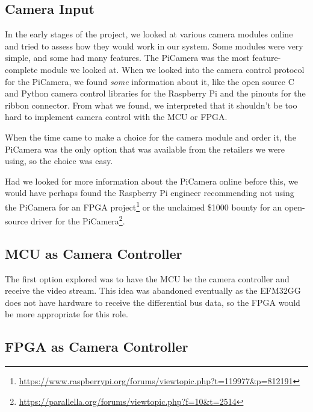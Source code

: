 \subsection{Camera Input}
\label{sec:camera_discussion}
In the early stages of the project,
we looked at various camera modules online and tried to assess how they would work in our system.
Some modules were very simple, and some had many features.
The PiCamera was the most feature-complete module we looked at.
When we looked into the camera control protocol for the PiCamera,
we found \textit{some} information about it,
like the open source C and Python camera control libraries for the Raspberry Pi
and the pinouts for the ribbon connector.
From what we found, we interpreted that it shouldn't be too hard to implement camera control with the MCU or FPGA.

When the time came to make a choice for the camera module and order it,
the PiCamera was the only option that was available from the retailers we were using,
so the choice was easy.

Had we looked for more information about the PiCamera online before this,
we would have perhaps found the Raspberry Pi engineer recommending not using the PiCamera for an FPGA project\footnote{\url{https://www.raspberrypi.org/forums/viewtopic.php?t=119977&p=812191}} or the unclaimed \$1000 bounty for an open-source driver for the PiCamera\footnote{\url{https://parallella.org/forums/viewtopic.php?f=10&t=2514}}.

\subsection{MCU as Camera Controller}

The first option explored was to have the MCU be the camera controller and receive the video stream.
This idea was abandoned eventually as the EFM32GG does not have hardware to receive the differential bus data,
so the FPGA would be more appropriate for this role.

\subsection{FPGA as Camera Controller}

